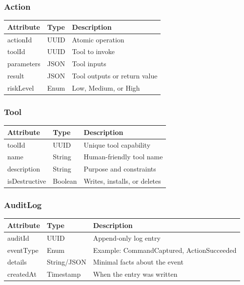 \documentclass[12pt]{article}
\begin{document}
\subsubsection*{Action}
\noindent\begin{tabularx}{\textwidth}{@{} l l X @{}}
\toprule
\textbf{Attribute} & \textbf{Type} & \textbf{Description} \\
\midrule
actionId & UUID & Atomic operation \\
toolId & UUID & Tool to invoke \\
parameters & JSON & Tool inputs \\
result & JSON & Tool outputs or return value \\
riskLevel & Enum & Low, Medium, or High \\
\bottomrule
\end{tabularx}\par\medskip

\subsubsection*{Tool}
\noindent\begin{tabularx}{\textwidth}{@{} l l X @{}}
\toprule
\textbf{Attribute} & \textbf{Type} & \textbf{Description} \\
\midrule
toolId & UUID & Unique tool capability \\
name & String & Human-friendly tool name \\
description & String & Purpose and constraints \\
isDestructive & Boolean & Writes, installs, or deletes \\
\bottomrule
\end{tabularx}\par\medskip

\subsubsection*{AuditLog}
\noindent\begin{tabularx}{\textwidth}{@{} l l X @{}}
\toprule
\textbf{Attribute} & \textbf{Type} & \textbf{Description} \\
\midrule
auditId & UUID & Append-only log entry \\
eventType & Enum & Example: CommandCaptured, ActionSucceeded \\
details & String/JSON & Minimal facts about the event \\
createdAt & Timestamp & When the entry was written \\
\bottomrule
\end{tabularx}\par\medskip
\end{document}
